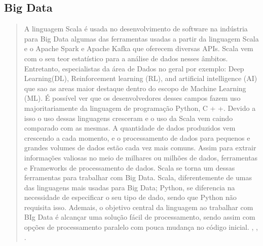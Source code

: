 \subsection{ Big Data}
\begin{quote}
   A linguagem Scala é usada no desenvolvimento de software na indústria para Big Data algumas das ferramentas usadas a partir da linguagem Scala e o Apache Spark e Apache Kafka que oferecem diversas APIs. Scala vem com o seu teor estatístico para a análise de dados nesses âmbitos. Entretanto, especialistas da área de Dados no geral por exemplo: Deep Learning(DL), Reinforcement learning (RL), and artificial intelligence (AI) que sao as areas  maior destaque dentro do escopo de Machine Learning (ML). É possível ver que os desenvolvedores desses campos fazem uso majoritariamente da linguagem de programação Python, C + +. Devido a isso o uso dessas linguagens cresceram e o uso da Scala vem caindo comparado com as mesmas. A quantidade de dados produzidos vem crescendo a cada momento, e o processamento de dados para pequenos e grandes volumes de dados estão cada vez mais comuns. Assim para extrair informações valiosas no meio de milhares ou milhões de dados, ferramentas e Frameworks de processamento de dados. Scala se torna um dessas ferramentas para trabalhar com Big Data.
   Scala, diferentemente de umas das linguagens mais usadas para Big Data; Python, se diferencia na necessidade de especificar o seu tipo de dado, sendo que Python não requisita isso.
   Ademais, o objetivo central da linguagem ao trabalhar com BIg Data é alcançar uma solução fácil de processamento, sendo assim com opções de processamento paralelo com pouca mudança no código inicial.
   \cite{Wampler2021},
   \cite{Data1},
   \cite{Data2}.
\end{quote}

